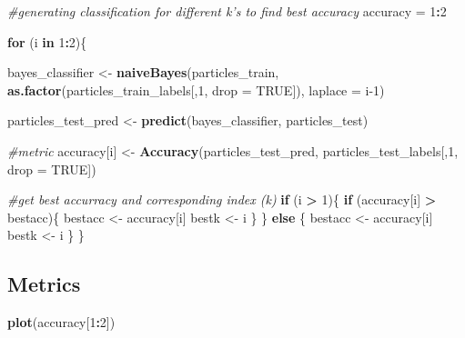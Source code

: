 \documentclass[
]{article}
\newenvironment{Shaded}{\begin{snugshade}}{\end{snugshade}}
\newcommand{\CommentTok}[1]{\textcolor[rgb]{0.56,0.35,0.01}{\textit{#1}}}
\newcommand{\ControlFlowTok}[1]{\textcolor[rgb]{0.13,0.29,0.53}{\textbf{#1}}}
\newcommand{\DataTypeTok}[1]{\textcolor[rgb]{0.13,0.29,0.53}{#1}}
\newcommand{\DecValTok}[1]{\textcolor[rgb]{0.00,0.00,0.81}{#1}}
\newcommand{\KeywordTok}[1]{\textcolor[rgb]{0.13,0.29,0.53}{\textbf{#1}}}
\newcommand{\NormalTok}[1]{#1}
\newcommand{\OperatorTok}[1]{\textcolor[rgb]{0.81,0.36,0.00}{\textbf{#1}}}
\newcommand{\OtherTok}[1]{\textcolor[rgb]{0.56,0.35,0.01}{#1}}
\newcommand{\StringTok}[1]{\textcolor[rgb]{0.31,0.60,0.02}{#1}}
\begin{document}
\begin{Shaded}
\begin{Highlighting}[]
\CommentTok{#generating classification for different k's to find best accuracy}
\NormalTok{accuracy =}\StringTok{ }\DecValTok{1}\OperatorTok{:}\DecValTok{2}

\ControlFlowTok{for}\NormalTok{ (i }\ControlFlowTok{in} \DecValTok{1}\OperatorTok{:}\DecValTok{2}\NormalTok{)\{}

\NormalTok{  bayes_classifier <-}\StringTok{ }\KeywordTok{naiveBayes}\NormalTok{(particles_train, }\KeywordTok{as.factor}\NormalTok{(particles_train_labels[,}\DecValTok{1}\NormalTok{, }\DataTypeTok{drop =} \OtherTok{TRUE}\NormalTok{]), }\DataTypeTok{laplace =}\NormalTok{ i}\DecValTok{-1}\NormalTok{)}

\NormalTok{  particles_test_pred <-}\StringTok{ }\KeywordTok{predict}\NormalTok{(bayes_classifier, particles_test)}
    
  \CommentTok{#metric}
\NormalTok{  accuracy[i] <-}\StringTok{ }\KeywordTok{Accuracy}\NormalTok{(particles_test_pred, particles_test_labels[,}\DecValTok{1}\NormalTok{, }\DataTypeTok{drop =} \OtherTok{TRUE}\NormalTok{])}

\CommentTok{#get best accurracy and corresponding index (k)}
  \ControlFlowTok{if}\NormalTok{ (i }\OperatorTok{>}\StringTok{ }\DecValTok{1}\NormalTok{)\{}
    \ControlFlowTok{if}\NormalTok{ (accuracy[i] }\OperatorTok{>}\StringTok{ }\NormalTok{bestacc)\{}
\NormalTok{      bestacc <-}\StringTok{ }\NormalTok{accuracy[i]}
\NormalTok{      bestk <-}\StringTok{ }\NormalTok{i}
\NormalTok{    \}}
\NormalTok{  \} }\ControlFlowTok{else}\NormalTok{ \{}
\NormalTok{    bestacc <-}\StringTok{ }\NormalTok{accuracy[i]}
\NormalTok{    bestk <-}\StringTok{ }\NormalTok{i}
\NormalTok{  \}}
\NormalTok{\}}
\end{Highlighting}
\end{Shaded}

\hypertarget{metrics-2}{%
\subsection{Metrics}\label{metrics-2}}

\begin{Shaded}
\begin{Highlighting}[]
\KeywordTok{plot}\NormalTok{(accuracy[}\DecValTok{1}\OperatorTok{:}\DecValTok{2}\NormalTok{])}
\end{Highlighting}
\end{Shaded}
\end{document}
